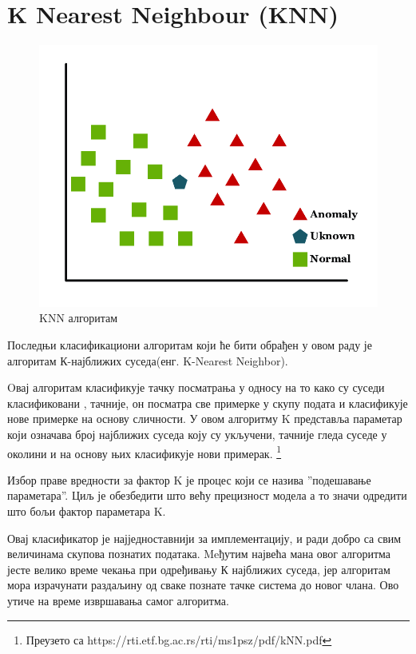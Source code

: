 \documentclass[11pt]{article} %
\begin{document}
\section{K Nearest Neighbour (KNN)}

\begin{figure}[h]
\centering
	\includegraphics[scale=0.3]{K-Nearest-Neighbor-KNN-classification-principle}
	\caption{KNN алгоритам} 
\end{figure}

Последњи класификациони алгоритам који ће бити обрађен у овом раду је алгоритам К-најближих суседа(енг. K-Nearest Neighbor). 

Oвај алгоритам класификује тачку посматрања у односу на то како су суседи класификовани
, тачније, он посматра све примерке у скупу подата и класификује нове примерке на основу сличности. У овом алгоритму K представља параметар који означава број најближих суседа коју су укључени, тачније гледа суседе у околини и на основу њих класификује нови примерак. \footnote{Преузето са https://rti.etf.bg.ac.rs/rti/ms1psz/pdf/kNN.pdf}

Избор праве вредности за фактор K је процес који се назива ''подешавање параметара''. Циљ је обезбедити што већу прецизност модела а то значи одредити што бољи фактор параметара K.

Овај класификатор је најједноставнији за имплементацију, и ради добро са свим величинама скупова познатих података. Meђутим највећа мана овог алгоритма јесте велико време чекања при одређивању К најближих суседа, јер алгоритам мора израчунати раздаљину од сваке познате тачке система до новог члана. Ово утиче на време извршавања самог алгоритма. 
\end{document}
